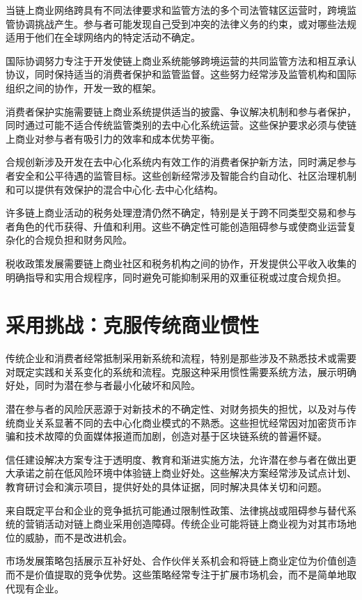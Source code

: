 \documentclass[
  Letterpaper,
]{scrbook}
\begin{document}
当链上商业网络跨具有不同法律要求和监管方法的多个司法管辖区运营时，跨境监管协调挑战产生。参与者可能发现自己受到冲突的法律义务的约束，或对哪些法规适用于他们在全球网络内的特定活动不确定。

国际协调努力专注于开发使链上商业系统能够跨境运营的共同监管方法和相互承认协议，同时保持适当的消费者保护和监管监督。这些努力经常涉及监管机构和国际组织之间的协作，开发一致的框架。

消费者保护实施需要链上商业系统提供适当的披露、争议解决机制和参与者保护，同时通过可能不适合传统监管类别的去中心化系统运营。这些保护要求必须与使链上商业对参与者有吸引力的效率和成本优势平衡。

合规创新涉及开发在去中心化系统内有效工作的消费者保护新方法，同时满足参与者安全和公平待遇的监管目标。这些创新经常涉及智能合约自动化、社区治理机制和可以提供有效保护的混合中心化-去中心化结构。

许多链上商业活动的税务处理澄清仍然不确定，特别是关于跨不同类型交易和参与者角色的代币获得、升值和利用。这些不确定性可能创造阻碍参与或使商业运营复杂化的合规负担和财务风险。

税收政策发展需要链上商业社区和税务机构之间的协作，开发提供公平收入收集的明确指导和实用合规程序，同时避免可能抑制采用的双重征税或过度合规负担。

\section{采用挑战：克服传统商业惯性}\label{ux91c7ux7528ux6311ux6218ux514bux670dux4f20ux7edfux5546ux4e1aux60efux6027}

传统企业和消费者经常抵制采用新系统和流程，特别是那些涉及不熟悉技术或需要对既定实践和关系变化的系统和流程。克服这种采用惯性需要系统方法，展示明确好处，同时为潜在参与者最小化破坏和风险。

潜在参与者的风险厌恶源于对新技术的不确定性、对财务损失的担忧，以及对与传统商业关系显著不同的去中心化商业模式的不熟悉。这些担忧经常因对加密货币诈骗和技术故障的负面媒体报道而加剧，创造对基于区块链系统的普遍怀疑。

信任建设解决方案专注于透明度、教育和渐进实施方法，允许潜在参与者在做出更大承诺之前在低风险环境中体验链上商业好处。这些解决方案经常涉及试点计划、教育研讨会和演示项目，提供好处的具体证据，同时解决具体关切和问题。

来自既定平台和企业的竞争抵抗可能通过限制性政策、法律挑战或阻碍参与替代系统的营销活动对链上商业采用创造障碍。传统企业可能将链上商业视为对其市场地位的威胁，而不是改进机会。

市场发展策略包括展示互补好处、合作伙伴关系机会和将链上商业定位为价值创造而不是价值提取的竞争优势。这些策略经常专注于扩展市场机会，而不是简单地取代现有企业。
\end{document}
